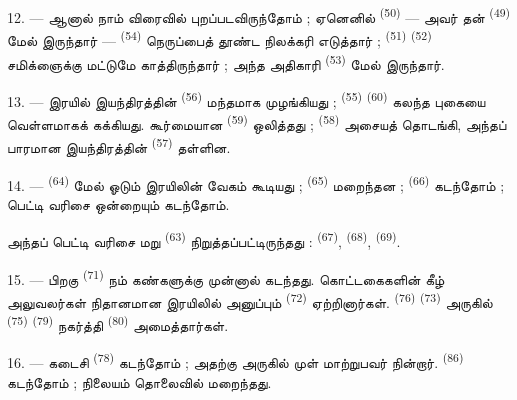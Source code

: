 12. --- ஆனால் நாம் விரைவில் புறப்படவிருந்தோம் ; ஏனெனில்
 \textsuperscript{(50)} — அவர்
தன்  \textsuperscript{(49)} மேல்
இருந்தார் —  \textsuperscript{(54)} நெருப்பைத் தூண்ட நிலக்கரி
எடுத்தார் ;  \textsuperscript{(51)}
 \textsuperscript{(52)} சமிக்ஞைக்கு
மட்டுமே காத்திருந்தார் ; அந்த அதிகாரி 
\textsuperscript{(53)} மேல் இருந்தார்.

13. --- இரயில் இயந்திரத்தின்  \textsuperscript{(56)}
மந்தமாக முழங்கியது ;  \textsuperscript{(55)}
 \textsuperscript{(60)} கலந்த புகையை
வெள்ளமாகக் கக்கியது. கூர்மையான  \textsuperscript{(59)}
ஒலித்தது ;  \textsuperscript{(58)} அசையத்
தொடங்கி, அந்தப் பாரமான இயந்திரத்தின் 
\textsuperscript{(57)} தள்ளின.

\VUsaut{3.0mm}
\VUsaut{3.0mm}

14. ---  \textsuperscript{(64)} மேல் ஓடும்
இரயிலின் வேகம் கூடியது ;  \textsuperscript{(65)}
மறைந்தன ;  \textsuperscript{(66)}
கடந்தோம் ; பெட்டி வரிசை ஒன்றையும் கடந்தோம்.


அந்தப் பெட்டி வரிசை மறு  \textsuperscript{(63)}
நிறுத்தப்பட்டிருந்தது : 
\textsuperscript{(67)},  \textsuperscript{(68)},
 \textsuperscript{(69)}.

15. --- பிறகு  \textsuperscript{(71)} நம்
கண்களுக்கு முன்னால் கடந்தது. கொட்டகைகளின் கீழ் அலுவலர்கள்
நிதானமான இரயிலில் அனுப்பும்  \textsuperscript{(72)}
ஏற்றினார்கள்.  \textsuperscript{(76)}
 \textsuperscript{(73)} அருகில்
 \textsuperscript{(75)}
 \textsuperscript{(79)} நகர்த்தி
 \textsuperscript{(80)} அமைத்தார்கள்.

16. --- கடைசி  \textsuperscript{(78)}
கடந்தோம் ; அதற்கு அருகில் முள் மாற்றுபவர் நின்றார்.
 \textsuperscript{(86)} கடந்தோம் ;
நிலையம் தொலைவில் மறைந்தது.

